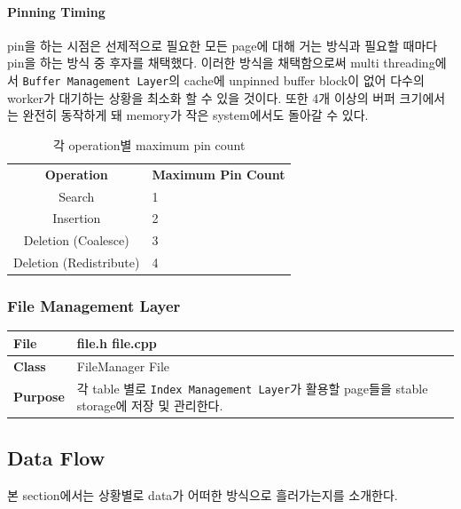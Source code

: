 \documentclass[main.tex]{subfiles}
\begin{document}
\paragraph{Pinning Timing}
pin을 하는 시점은 선제적으로 필요한 모든 page에 대해 거는 방식과 필요할 때마다 pin을 하는 방식 중 후자를 채택했다. 이러한 방식을 채택함으로써 multi threading에서 \texttt{Buffer Management Layer}의 cache에 unpinned buffer block이 없어 다수의 worker가 대기하는 상황을 최소화 할 수 있을 것이다. 또한 4개 이상의 버퍼 크기에서는 완전히 동작하게 돼 memory가 작은 system에서도 돌아갈 수 있다.

\begin{table}[!htb]
	\centering
	\begin{tabularx}{.6\textwidth}{|c|X|}
		\hline
		\textbf{Operation} & \textbf{Maximum Pin Count} \\
		\hhline{|=|=|}
		Search & 1 \\
		\hline
		Insertion & 2 \\
		\hline
		Deletion (Coalesce) & 3 \\
		\hline
		Deletion (Redistribute) & 4 \\
		\hline
	\end{tabularx}
	\caption{각 operation별 maximum pin count}
\end{table}

\subsubsection{File Management Layer}
\begin{table}[!htb]
	\begin{tabularx}{\textwidth}{|l|X|}
		\hline
		\textbf{File} & file.h file.cpp \\
		\hline
		\textbf{Class} & FileManager File \\
		\hline
		\textbf{Purpose} & 각 table 별로 \texttt{Index Management Layer}가 활용할 page들을 stable storage에 저장 및 관리한다. \\
		\hline
	\end{tabularx}
\end{table}

\newpage
\subsection{Data Flow}
본 section에서는 상황별로 data가 어떠한 방식으로 흘러가는지를 소개한다.
\end{document}
